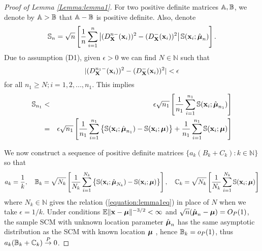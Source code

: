\begin{proof}[Proof of Lemma \ref{Lemma:lemma1}]
For two positive definite matrices ${\mathbb{A}}, {\mathbb{B}}$, we denote by $ {\mathbb{A}} > {\mathbb{B}}$ that ${\mathbb{A}}-{\mathbb{B}}$ is positive definite. Also, denote
%
$$
{\mathbb{S}}_n = \sqrt n \left[ \frac{1}{n} \sum_{i=1}^n \left| ( D^{n-} _{\mathbf{X}} ({\bf{x}}_i))^2  - (D^-_{\mathbf{X}} ({\bf{x}}_i))^2 \right| {\mathbb{S}}( {\bf{x}}_i; \hat{{\boldsymbol{\mu}}}_n) \right].
$$
%
Due to assumption (D1), given $\epsilon>0$ we can find $N \in \mathbb{N}$ such that
%
\begin{equation}
\label{equation:lemma1eq}
| (D^{n_1 -}_{\mathbf{X}}({\bf{x}}_i))^2 - (D^-_{\mathbf{X}}({\bf{x}}_i))^2 | < \epsilon
\end{equation}
%
for all $n_1 \geq N; i = 1,2,...,n_1$. This implies
%
\begin{eqnarray}
{\mathbb{S}}_{n_1} &< & \epsilon \sqrt{n_1} \left[ \frac{1}{n_1} \sum_{i=1}^{n_1} {\mathbb{S}}( {\bf{x}}_i; \hat{{\boldsymbol{\mu}}}_{n_1}) \right]\notag\\
&=& \epsilon \sqrt{n_1} \left[ \frac{1}{n_1} \sum_{i=1}^{n_1} \left\{ {\mathbb{S}}( {\bf{x}}_i; \hat{{\boldsymbol{\mu}}}_{n_1}) - {\mathbb{S}}( {\bf{x}}_i; {\boldsymbol{\mu}}) \right\} + \frac{1}{n_1} \sum_{i=1}^{n_1} {\mathbb{S}}( {\bf{x}}_i; {\boldsymbol{\mu}}) \right]\label{eqn:lemma1eq2}
\end{eqnarray}

We now construct a sequence of positive definite matrices $\{a_k (B_k+C_k) : k \in \mathbb N\} $ so that
%
$$
a_k = \frac{1}{k}, \quad {\mathbb{B}}_k = \sqrt{N_k} \left[ \frac{1}{N_k} \sum_{i=1}^{N_k} \left\{ {\mathbb{S}}( {\bf{x}}_i; \hat{{\boldsymbol{\mu}}}_{N_k}) - {\mathbb{S}}({\bf{x}}_i; {\boldsymbol{\mu}}) \right\} \right],
\quad {\mathbb{C}}_k = \sqrt{N_k} \left[ \frac{1}{N_k} \sum_{i=1}^{N_k} {\mathbb{S}}({\bf{x}}_i; {\boldsymbol{\mu}}) \right]
$$
%
where $N_k \in \mathbb N$ gives the relation (\ref{equation:lemma1eq}) in place of $N$ when we take $\epsilon = 1/k$. Under conditions $ {\mathbb{E}} \|{\bf{x}} - {\boldsymbol{\mu}}\|^{-3/2} < \infty $ and $\sqrt n (\hat{{\boldsymbol{\mu}}}_n - {\boldsymbol{\mu}}) = O_P(1)$, the sample SCM with unknown location parameter $\hat{{\boldsymbol{\mu}}}_n$ has the same asymptotic distribution as the SCM with known location ${\boldsymbol{\mu}}$ \citep{durre14}, hence ${\mathbb{B}}_k = o_P(1)$, thus $a_k ({\mathbb{B}}_k + {\mathbb{C}}_k) \stackrel{P}{\rightarrow} 0$.


\end{proof}
